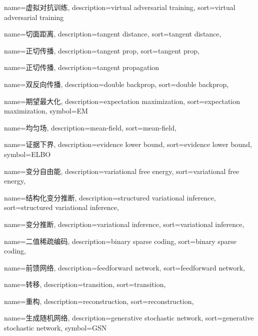 {
  name=虚拟对抗训练,
  description={virtual adversarial training},
  sort={virtual adversarial training}
}

{
  name=切面距离,
  description={tangent distance},
  sort={tangent distance},
}

{
  name=正切传播,
  description={tangent prop},
  sort={tangent prop},
}

{
  name=正切传播,
  description={tangent propagation}
}

{
  name=双反向传播,
  description={double backprop},
  sort={double backprop},
}

{
  name=期望最大化,
  description={expectation maximization},
  sort={expectation maximization},
  symbol={EM}
}

{
  name=均匀场,
  description={mean-field},
  sort={mean-field},
}

{
  name=证据下界,
  description={evidence lower bound},
  sort={evidence lower bound},
  symbol={ELBO}
}

{
  name=变分自由能,
  description={variational free energy},
  sort={variational free energy},
}

{
  name=结构化变分推断,
  description={structured variational inference},
  sort={structured variational inference},
}

{
  name=变分推断,
  description={variational inference},
  sort={variational inference},
}

{
  name=二值稀疏编码,
  description={binary sparse coding},
  sort={binary sparse coding},
}

{
  name=前馈网络,
  description={feedforward network},
  sort={feedforward network},
}

{
  name=转移,
  description={transition},
  sort={transition},
}

{
  name=重构,
  description={reconstruction},
  sort={reconstruction},
}

{
  name=生成随机网络,
  description={generative stochastic network},
  sort={generative stochastic network},
  symbol={GSN}
}


